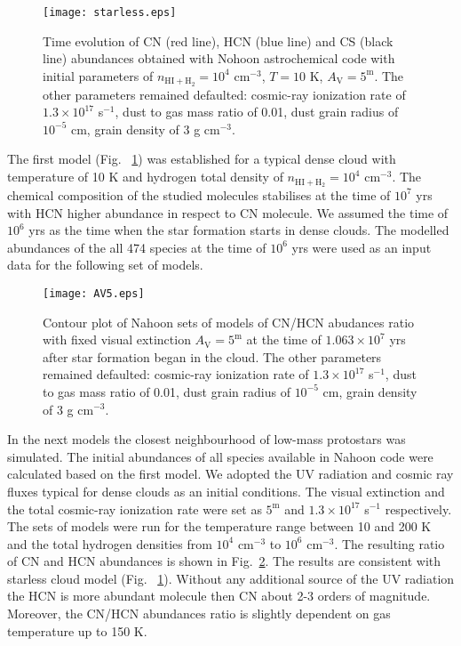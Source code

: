 \documentclass{aa}
\begin{document}
\begin{figure}
   \centering
   \texttt{[image: starless.eps]}
      \caption{Time evolution of CN (red line), HCN (blue line) and CS (black line) abundances obtained with Nohoon astrochemical code with initial parameters of $n_\mathrm{HI+H_2} = 10^4$ cm$^{-3}$, $T = 10$ K, $A_\mathrm{V} = 5^{\mathrm{m}}$. The other parameters remained defaulted: cosmic-ray ionization rate of $1.3\times10^{17}$ s$^{-1}$, dust to gas mass ratio of 0.01, dust grain radius of $10^{-5}$ cm, grain density of 3 g cm$^{-3}$.}
         \label{starless}
   \end{figure}

The first model (Fig. ~\ref{starless}) was established for a typical dense cloud with temperature of 10 K and hydrogen total density of $n_\mathrm{HI+H_2} = 10^4$ cm$^{-3}$. The chemical composition of the studied molecules stabilises at the time of $10^{7}$ yrs with HCN higher abundance in respect to CN molecule. We assumed the time of $10^{6}$ yrs as the time when the star formation starts in dense clouds. The modelled abundances of the all 474 species at the time of $10^{6}$ yrs were used as an input data for the following set of models.

\begin{figure}
   \centering
   \texttt{[image: AV5.eps]}
      \caption{Contour plot of Nahoon sets of models of CN/HCN abudances ratio with fixed visual extinction $A_\mathrm{V} = 5^{\mathrm{m}}$ at the time of $1.063\times 10^{7}$ yrs after star formation began in the cloud. The other parameters remained defaulted: cosmic-ray ionization rate of $1.3\times 10^{17}$ s$^{-1}$, dust to gas mass ratio of 0.01, dust grain radius of $10^{-5}$ cm, grain density of 3 g cm$^{-3}$. }
         \label{AV5}
   \end{figure}

In the next models the closest neighbourhood of low-mass protostars was simulated. The initial abundances of all species available in Nahoon code were calculated based on the first model. We adopted the UV radiation and cosmic ray fluxes typical for dense clouds as an initial conditions. The visual extinction and the total cosmic-ray ionization rate were set as $5^{\mathrm{m}}$ and $1.3\times 10^{17}$ s$^{-1}$ respectively. The sets of models were run for the temperature range between 10 and 200 K and the total hydrogen densities from $10^4$ cm$^{-3}$ to $10^6$ cm$^{-3}$. The resulting ratio of CN and HCN abundances is shown in Fig.~\ref{AV5}. The results are consistent with starless cloud model (Fig. ~\ref{starless}). Without any additional source of the UV radiation the HCN is more abundant molecule then CN about 2-3 orders of magnitude. Moreover, the CN/HCN abundances ratio is slightly dependent on gas temperature up to 150 K. 
\end{document}
